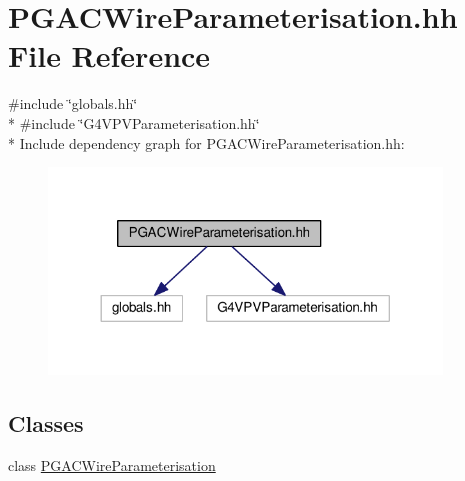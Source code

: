\hypertarget{PGACWireParameterisation_8hh}{}\section{P\+G\+A\+C\+Wire\+Parameterisation.\+hh File Reference}
\label{PGACWireParameterisation_8hh}
{\ttfamily \#include \char`\"{}globals.\+hh\char`\"{}}\\*
{\ttfamily \#include \char`\"{}G4\+V\+P\+V\+Parameterisation.\+hh\char`\"{}}\\*
Include dependency graph for P\+G\+A\+C\+Wire\+Parameterisation.\+hh\+:
\nopagebreak
\begin{figure}[H]
\begin{center}
\leavevmode
\includegraphics[width=296pt]{PGACWireParameterisation_8hh__incl}
\end{center}
\end{figure}
\subsection*{Classes}
\begin{DoxyCompactItemize}
\item 
class \hyperlink{classPGACWireParameterisation}{P\+G\+A\+C\+Wire\+Parameterisation}
\end{DoxyCompactItemize}

